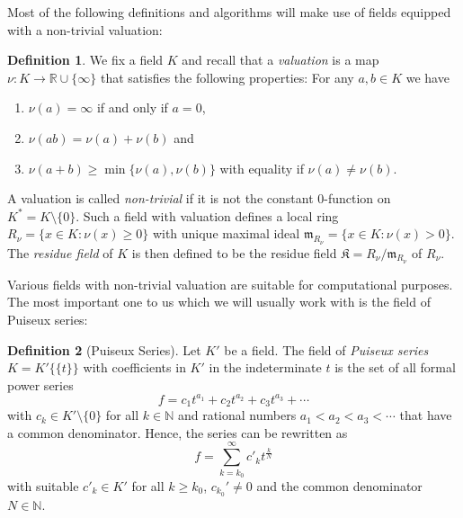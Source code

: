 \documentclass[
  paper=a4,
  titlepage,
  bibliography=totoc,
  listof=totoc,
  pagesize=pdftex
]{scrartcl}
\numberwithin{figure}{section}
\numberwithin{equation}{section}
\numberwithin{table}{section}
\newcommand*\setR{\mathds{R}}
\newcommand*\setN{\mathds{N}}
\newcommand*\puiseux[2]{#1\{\!\{#2\}\!\}}
\theoremstyle{definition}
\newtheorem{definition}{Definition}
\numberwithin{definition}{section}
\begin{document}
Most of the following definitions and algorithms will make use of fields equipped with a
non-trivial valuation:

\begin{definition} \label{def:val}
  We fix a field $K$ and recall that a \emph{valuation} is a map $\nu:K\to \setR \cup
  \{\infty\}$ that satisfies the following properties: For any $a, b \in K$ we have
  \begin{enumerate}
    \item $\nu(a) = \infty$ if and only if $a=0$,
    \item $\nu(ab) = \nu(a)+\nu(b)$ and
    \item $\nu(a+b) \geq \min\{\nu(a), \nu(b)\}$ with equality if $\nu(a)\neq \nu(b)$.
      \label{def:val:eq}
  \end{enumerate}
\end{definition}

A valuation is called \emph{non-trivial} if it is not the constant 0-function on $K^* =
K\setminus\{0\}$. Such a field with valuation defines a local ring $R_\nu = \{ x \in K :
\nu(x) \geq 0 \}$ with unique maximal ideal $\mathfrak m_{R_\nu} = \{ x \in K : \nu(x) > 0
\}$. The \emph{residue field} of $K$ is then defined to be the residue field $\mathfrak K
= R_\nu/\mathfrak m_{R_\nu}$ of $R_\nu$. %

Various fields with non-trivial valuation are suitable for computational purposes. The
most important one to us which we will usually work with is the field of Puiseux series:

\begin{definition}[Puiseux Series]
  \label{def:puiseux}
  Let $K'$ be a field. The field of \emph{Puiseux series} $K = \puiseux{K'}{t}$ with
  coefficients in $K'$ in the indeterminate $t$ is the set of all formal power series
  \begin{equation} \label{eq:puiseux1}
    f = c_1 t^{a_1} + c_2 t^{a_2} + c_3 t^{a_3} + \cdots
  \end{equation}
  with $c_k \in K'\setminus\{0\}$ for all $k \in \setN$ and rational numbers $a_1 < a_2 <
  a_3 < \cdots$ that have a common denominator. Hence, the series can be rewritten as
  \begin{equation} \label{eq:puiseux2}
    f = \sum_{k = k_0}^\infty c'_k t^{\frac kN}
  \end{equation}
  with suitable $c'_k \in K'$ for all $k\geq k_0$, $c_{k_0}'\neq0$ and the common
  denominator $N \in \setN$.
\end{definition}
\end{document}
